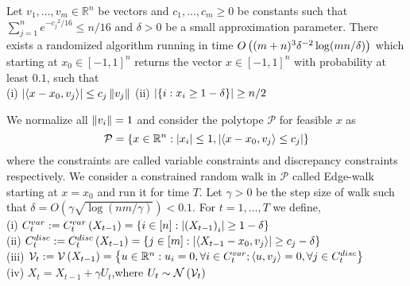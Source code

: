 \begin{lemma} \label{pcl}
Let $v_1,\hdots,v_m \in \mathbb{R}^n$ be vectors and $c_1,\hdots,c_m \geq 0$ be constants such that $\sum_{j=1}^{n}e^{{-c_j}^2/16} \leq n/16$ and $\delta > 0$ be a small approximation parameter.
There exists a randomized algorithm running in time $O\left((m+n)^3{\delta}^{-2}\log(mn/\delta) \right )$ which starting at $x_0 \in [-1,1]^n$ returns the vector $x \in [-1,1]^n$ with probability at least $0.1$, such that\\
\qquad (i) $\left\lvert \left\langle x-x_0,v_j\right\rangle \right\rvert \leq c_j\left\lVert v_j \right\rVert$ \qquad \qquad \qquad \qquad
(ii) $\left\lvert \left\{i:x_i \geq 1- \delta\right\} \right\rvert \geq n/2$
\end{lemma}
We normalize all $\left\lVert v_i \right\rVert=1$ and consider the polytope $\mathcal{P}$ for feasible $x$ as 
\[ \mathcal{P} = \left\{x\in \mathbb{R}^n : \left\lvert x_i \right\rvert \leq 1, \left\lvert \left\langle x-x_0,v_j\right\rangle \leq c_j \right\rvert \right\}\] where the constraints are called variable constraints and discrepancy constraints respectively. 
We consider a constrained random walk in $\mathcal{P}$ called Edge-walk starting at $x=x_0$ and run it for time $T$. Let $\gamma >0$ be the step size of walk such that $\delta = O(\gamma \sqrt{\log(nm/\gamma)}) < 0.1$. For $t= 1,\hdots,T$ we define,\\
(i) $C_t^{var} := C_t^{var}\left(X_{t-1} \right ) = \left\{ i \in [n] : \left\lvert \left(X_{t-1} \right )_i \right\rvert \geq 1- \delta\right\}$ \\
(ii) $C_t^{disc} := C_t^{disc}\left(X_{t-1} \right ) = \left\{j \in [m] : \left\lvert \left\langle X_{t-1}-x_0,v_j\right\rangle \right\rvert \geq c_j - \delta\right\}$ \\
(iii) $\mathcal{V}_t := \mathcal{V}\left(X_{t-1} \right ) = \left\{u \in \mathbb{R}^n : u_i = 0, \forall i \in C_t^{var}; \left\langle u,v_j\right\rangle=0, \forall j \in C_t^{disc} \right\}$  \\
(iv) $X_t = X_{t-1} + \gamma U_t$,where $U_t \sim \mathcal{N}\left(\mathcal{V}_t \right )$

